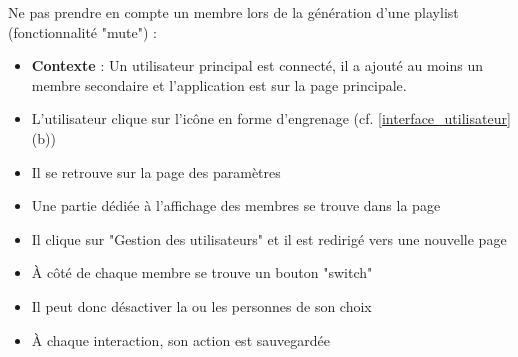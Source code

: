 \documentclass{article}
\begin{document}
		Ne pas prendre en compte un membre lors de la génération d'une playlist (fonctionnalité "mute") :
		\begin{itemize}
			\item[] \textbf{Contexte} : Un utilisateur principal est connecté, il a ajouté au moins un membre secondaire et l'application est sur la page principale.
			\item L'utilisateur clique sur l'icône en forme d'engrenage (cf. \ref{interface_utilisateur} (b))
			\item Il se retrouve sur la page des paramètres
			\item Une partie dédiée à l'affichage des membres se trouve dans la page
			\item Il clique sur "Gestion des utilisateurs" et il est redirigé vers une nouvelle page
			\item À côté de chaque membre se trouve un bouton "switch"
			\item Il peut donc désactiver la ou les personnes de son choix
			\item À chaque interaction, son action est sauvegardée
		\end{itemize}
        
        \newpage
\end{document}
